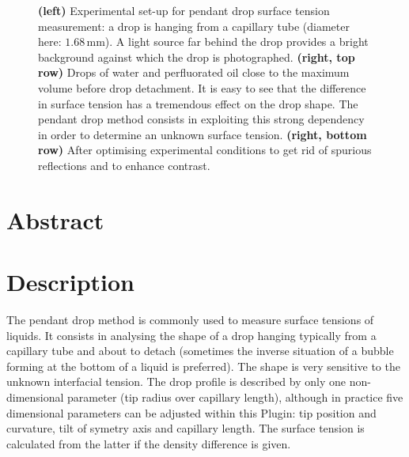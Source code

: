 \documentclass[fleqn]{scrartcl}
\newcommand{\gouttependante}{\texttt{Goutte\_pendante}\xspace}
\begin{document}
\begin{figure}
{}
\caption{\textbf{(left)} Experimental set-up for pendant drop surface
  tension measurement: a drop is hanging from a capillary tube
  (diameter here: $1.68\,$mm). A light source far behind the drop
  provides a bright background against which the drop is photographed.
  \textbf{(right, top row)} Drops of water and perfluorated oil close
  to the maximum volume before drop detachment. It is easy to see that
  the difference in surface tension has a tremendous effect on the
  drop shape. The pendant drop method consists in exploiting this
  strong dependency in order to determine an unknown surface tension.
  \textbf{(right, bottom row)} After optimising experimental
  conditions to get rid of spurious reflections and to enhance
  contrast.}
\label{fig:pendantdropphoto}
\end{figure}

\section*{Abstract}
\label{sec:abstract}

\begin{abstract}
  The pendant drop method for surface tension measurement consists in
  analysing the shape of a drop hanging from a capillary tube
  (Fig.~\ref{fig:pendantdropphoto}). The \gouttependante Plugin for
  \href{http://imagej.nih.gov/ij/}{ImageJ}~\cite{ImageJ} provides a
  tool to match a theoretical profile to the contour of a pendant
  drop, either interactively or automatically. The surface tension can
  then be easily calculated from the best matching parameters.
  Section~\ref{sec:description} describes the Plugin functionality,
  section~\ref{sec:prerequisites} lists the properties that the input
  image must have for the Plugin to give meaningful results. Sections
  \ref{sec:installation} and \ref{sec:usage} explain the installation
  and the usage of the Plugin. Finally sections~\ref{sec:theory} and
  \ref{sec:numerics} describe the underlying theoretical framework and
  the plugin's inner workings, respectively.
\end{abstract}


\section{Description}
\label{sec:description}

The pendant drop method is commonly used to measure surface tensions
of liquids. It consists in analysing the shape of a drop hanging
typically from a capillary tube and about to detach (sometimes the
inverse situation of a bubble forming at the bottom of a liquid is
preferred). The shape is very sensitive to the unknown interfacial
tension. The drop profile is described by only one non-dimensional
parameter (tip radius over capillary length), although in practice
five dimensional parameters can be adjusted within this Plugin: tip
position and curvature, tilt of symetry axis and capillary length. The
surface tension is calculated from the latter if the density
difference is given.
\end{document}
